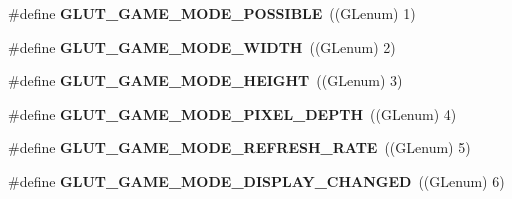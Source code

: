 \begin{DoxyCompactItemize}
\item 
\#define {\bf G\+L\+U\+T\+\_\+\+G\+A\+M\+E\+\_\+\+M\+O\+D\+E\+\_\+\+P\+O\+S\+S\+I\+B\+LE}~((G\+Lenum) 1)
\item 
\#define {\bf G\+L\+U\+T\+\_\+\+G\+A\+M\+E\+\_\+\+M\+O\+D\+E\+\_\+\+W\+I\+D\+TH}~((G\+Lenum) 2)
\item 
\#define {\bf G\+L\+U\+T\+\_\+\+G\+A\+M\+E\+\_\+\+M\+O\+D\+E\+\_\+\+H\+E\+I\+G\+HT}~((G\+Lenum) 3)
\item 
\#define {\bf G\+L\+U\+T\+\_\+\+G\+A\+M\+E\+\_\+\+M\+O\+D\+E\+\_\+\+P\+I\+X\+E\+L\+\_\+\+D\+E\+P\+TH}~((G\+Lenum) 4)
\item 
\#define {\bf G\+L\+U\+T\+\_\+\+G\+A\+M\+E\+\_\+\+M\+O\+D\+E\+\_\+\+R\+E\+F\+R\+E\+S\+H\+\_\+\+R\+A\+TE}~((G\+Lenum) 5)
\item 
\#define {\bf G\+L\+U\+T\+\_\+\+G\+A\+M\+E\+\_\+\+M\+O\+D\+E\+\_\+\+D\+I\+S\+P\+L\+A\+Y\+\_\+\+C\+H\+A\+N\+G\+ED}~((G\+Lenum) 6)
\end{DoxyCompactItemize}
